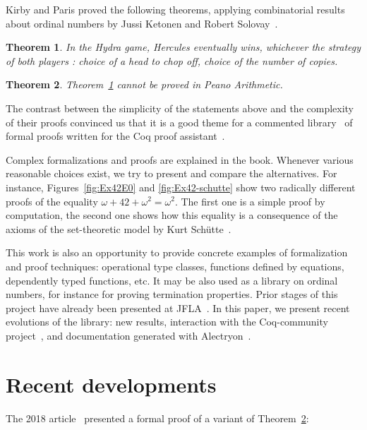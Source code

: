 \documentclass{easychair}
\newtheorem{theorem}{Theorem}
\newcommand{\coq}{Coq\xspace}
\newcommand{\community}{Coq-community\xspace}
\newcommand{\alectr}{Alectryon\xspace}
\begin{document}

Kirby and Paris proved the following theorems, applying
combinatorial results about ordinal numbers by Jussi Ketonen and Robert Solovay~\cite{KS81}.

\begin{theorem}
  In the Hydra game, Hercules eventually wins, whichever the strategy of both players :
  choice of a head to chop off, choice of the number of copies. 
 \label{kp:thm1}
\end{theorem}

\begin{theorem}
  Theorem~\ref{kp:thm1} cannot be proved in Peano Arithmetic. \label{kp:thm2}
\end{theorem}

The contrast between the simplicity of the statements above and the complexity of their proofs convinced us that it is a good theme for a commented library~\cite{HydraBattles} of formal proofs written for the \coq proof assistant~\cite{Coq}. 

Complex formalizations and proofs are explained in the book.
Whenever various reasonable choices exist, we try to present and compare the alternatives.
  For instance, Figures~\ref{fig:Ex42E0} and \ref{fig:Ex42-schutte} show two radically different proofs of the equality
  $\omega+42+\omega^2=\omega^2$. The first one is a simple proof by computation, the second one shows how this equality
  is a consequence of the axioms of the set-theoretic model  by Kurt Schütte~\cite{schutte}. 

This work is also an opportunity to 
 provide concrete examples of formalization and proof techniques: operational type classes, functions defined by  equations, dependently typed functions, etc. It may be also used as a library on ordinal numbers, for instance for proving termination properties.
%
 Prior stages of this project have already been presented at
 JFLA~\cite{PCiota, JFLA2018paper}.
In this paper, we present recent evolutions of the library: new results, interaction with the \community project~\cite{CoqCommunity}, and documentation generated with \alectr~\cite{alectryonpaper, alectryongithub}.

\section{Recent developments}
The 2018 article~\cite{JFLA2018paper} presented a formal proof of  a variant of Theorem~\ref{kp:thm2}:
\end{document}
